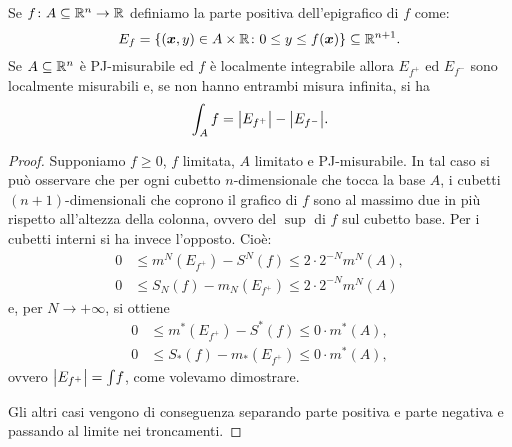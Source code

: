\begin{theorem}
Se $f\colon A\subseteq {\mathbb R}^n \to {\mathbb R}$ definiamo la parte positiva dell'epigrafico di $f$
come:
\[
  E_f = {\left\{ (\boldsymbol x,y)\in A\times {\mathbb R} \colon 0 \le y \le f(\boldsymbol x) \right\}} \subseteq {\mathbb R}^{n+1}.
\]
Se $A\subseteq {\mathbb R}^n$ è PJ-misurabile ed $f$ è localmente integrabile 
allora $E_{f^+}$ ed $E_{f^-}$ sono localmente misurabili e, se non
hanno entrambi misura infinita, si ha 
\[
  \int_A f = {\left|E_{f^+}\right|} - {\left|E_{f^-}\right|}.
\]
\end{theorem}

\begin{proof}
Supponiamo $f\ge 0$, $f$ limitata, $A$ limitato e PJ-misurabile.
In tal caso si può osservare che 
per ogni cubetto $n$-dimensionale che tocca la base $A$, 
i cubetti $(n+1)$-dimensionali che coprono il grafico di $f$ 
sono al massimo due in più rispetto all'altezza della colonna, 
ovvero del $\sup$ di $f$ sul cubetto base. 
Per i cubetti interni si ha invece l'opposto. Cioè:
\begin{align*}
    0 & \le m^N(E_{f^+}) - S^N(f) \le 2\cdot 2^{-N} m^N(A),\\
    0 & \le S_N(f) - m_N(E_{f^+}) \le 2\cdot 2^{-N} m^N(A)
\end{align*}
e, per $N\to +\infty$, si ottiene 
\begin{align*}
  0 &\le m^*(E_{f^+}) - S^*(f) \le 0\cdot m^*(A), \\
  0 &\le S_*(f) - m_*(E_{f^+}) \le 0\cdot m^*(A), 
\end{align*}
ovvero ${\left|E_{f^+}\right|}=\int\! f$, come volevamo dimostrare.

Gli altri casi vengono di conseguenza separando parte positiva e parte negativa 
e passando al limite nei troncamenti.
\end{proof}

